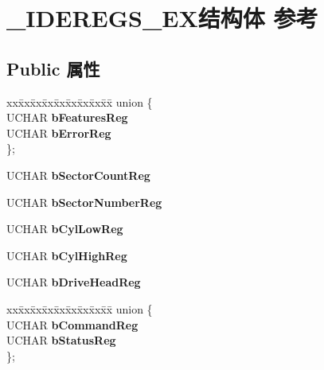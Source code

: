 \hypertarget{struct___i_d_e_r_e_g_s___e_x}{}\section{\+\_\+\+I\+D\+E\+R\+E\+G\+S\+\_\+\+E\+X结构体 参考}
\label{struct___i_d_e_r_e_g_s___e_x}
\subsection*{Public 属性}
\begin{DoxyCompactItemize}
\item 
\mbox{\label{struct___i_d_e_r_e_g_s___e_x_a43146756cc9e71298f9567573a6cfddc}} 
\begin{tabbing}
xx\=xx\=xx\=xx\=xx\=xx\=xx\=xx\=xx\=\kill
union \{\\
\>UCHAR {\bfseries bFeaturesReg}\\
\>UCHAR {\bfseries bErrorReg}\\
\}; \\

\end{tabbing}\item 
\mbox{\label{struct___i_d_e_r_e_g_s___e_x_abcbaf201eeb06a782934ad8c536bfbdd}} 
U\+C\+H\+AR {\bfseries b\+Sector\+Count\+Reg}
\item 
\mbox{\label{struct___i_d_e_r_e_g_s___e_x_ad9b69ed4e89c615d08b73dd37c1df3ae}} 
U\+C\+H\+AR {\bfseries b\+Sector\+Number\+Reg}
\item 
\mbox{\label{struct___i_d_e_r_e_g_s___e_x_aeec4018dd240f80d80822fe7c125c505}} 
U\+C\+H\+AR {\bfseries b\+Cyl\+Low\+Reg}
\item 
\mbox{\label{struct___i_d_e_r_e_g_s___e_x_adb2afae19b0ff1c2ba81c12160d5a305}} 
U\+C\+H\+AR {\bfseries b\+Cyl\+High\+Reg}
\item 
\mbox{\label{struct___i_d_e_r_e_g_s___e_x_a90ff10f886942747ac764d65d796d016}} 
U\+C\+H\+AR {\bfseries b\+Drive\+Head\+Reg}
\item 
\mbox{\label{struct___i_d_e_r_e_g_s___e_x_aeead14e05cbf62ac467fb53f694ec234}} 
\begin{tabbing}
xx\=xx\=xx\=xx\=xx\=xx\=xx\=xx\=xx\=\kill
union \{\\
\>UCHAR {\bfseries bCommandReg}\\
\>UCHAR {\bfseries bStatusReg}\\
\}; \\


\end{tabbing}
\end{DoxyCompactItemize}
